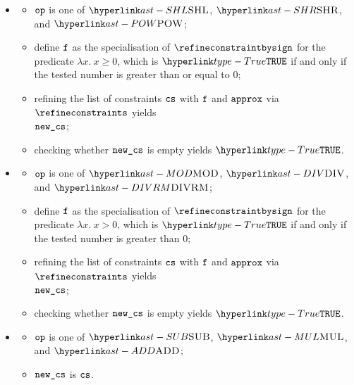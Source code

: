 \ProseParagraph
\OneApplies
\begin{itemize}
  \item {}
  \begin{itemize}
    \item $\texttt{op}$ is one of $\SHL$, $\SHR$, and $\POW$;
    \item define $\texttt{f}$ as the specialisation of $\refineconstraintbysign$ for the predicate
          $\lambda x.\ x \geq 0$, which is $\True$ if and only if the tested number is greater than or equal to $0$;
    \item refining the list of constraints $\texttt{cs}$ with $\texttt{f}$ and $\texttt{approx}$ via $\refineconstraints$ yields \\
          $\texttt{new\_cs}$\ProseTerminateAs{\CannotUnderapproximate, \CannotOverapproximate};
    \item checking whether $\texttt{new\_cs}$ is empty yields $\True$\ProseTerminateAs{\BadOperands}.
  \end{itemize}

  \item {}
  \begin{itemize}
    \item $\texttt{op}$ is one of $\MOD$, $\DIV$, and $\DIVRM$;
    \item define $\texttt{f}$ as the specialisation of $\refineconstraintbysign$ for the predicate
          $\lambda x.\ x > 0$, which is $\True$ if and only if the tested number is greater than $0$;
    \item refining the list of constraints $\texttt{cs}$ with $\texttt{f}$ and $\texttt{approx}$ via $\refineconstraints$ yields \\
          $\texttt{new\_cs}$\ProseTerminateAs{\CannotUnderapproximate, \CannotOverapproximate};
    \item checking whether $\texttt{new\_cs}$ is empty yields $\True$\ProseTerminateAs{\BadOperands}.
  \end{itemize}

  \item {}
  \begin{itemize}
    \item $\texttt{op}$ is one of $\SUB$, $\MUL$, and $\ADD$;
    \item $\texttt{new\_cs}$ is $\texttt{cs}$.
  \end{itemize}
\end{itemize}

\FormallyParagraph
\begin{mathpar}
\end{mathpar}

